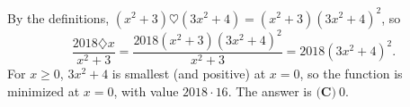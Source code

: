 By the definitions, $(x^2+3)\heartsuit(3x^2+4)=(x^2+3)(3x^2+4)^2$, so
\[
\dfrac{2018\diamondsuit x}{x^2+3}=\dfrac{2018(x^2+3)(3x^2+4)^2}{x^2+3}=2018(3x^2+4)^2 .
\]
For $x\ge0$, $3x^2+4$ is smallest (and positive) at $x=0$, so the function is minimized at $x=0$, with value $2018\cdot16$. The answer is $\boxed{\textbf{(C)}\ 0}$.
